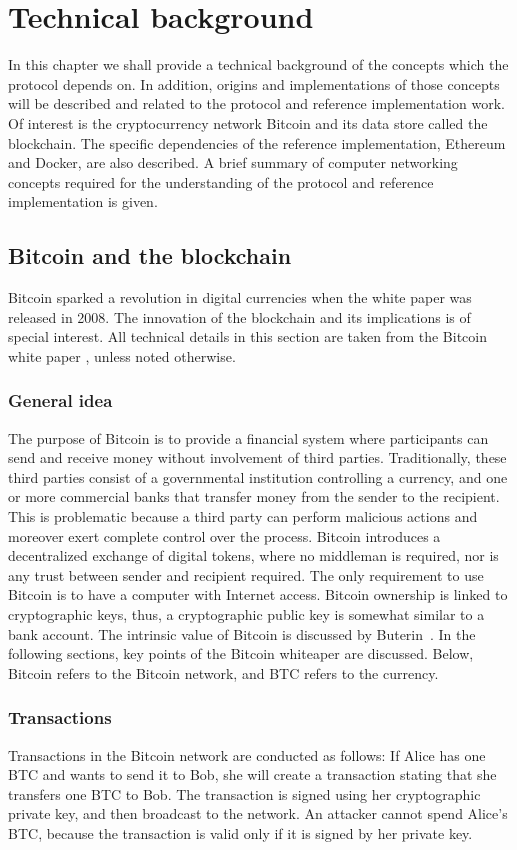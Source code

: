 \chapter{Technical background}
In this chapter we shall provide a technical background of the concepts which the protocol depends on. In addition, origins and implementations of those concepts will be described and related to the protocol and reference implementation work. Of interest is the cryptocurrency network Bitcoin and its data store called the blockchain. The specific dependencies of the reference implementation, Ethereum and Docker, are also described. A brief summary of computer networking concepts required for the understanding of the protocol and reference implementation is given.

\section{Bitcoin and the blockchain}
Bitcoin sparked a revolution in digital currencies when the white paper was released in 2008. The innovation of the blockchain and its implications is of special interest. All technical details in this section are taken from the Bitcoin white paper \cite{btc}, unless noted otherwise.

\subsection{General idea}
The purpose of Bitcoin is to provide a financial system where participants can send and receive money without involvement of third parties. Traditionally, these third parties consist of a governmental institution controlling a currency, and one or more commercial banks that transfer money from the sender to the recipient. This is problematic because a third party can perform malicious actions and moreover exert complete control over the process. Bitcoin introduces a decentralized exchange of digital tokens, where no middleman is required, nor is any trust between sender and recipient required. The only requirement to use Bitcoin is to have a computer with Internet access. Bitcoin ownership is linked to cryptographic keys, thus, a cryptographic public key is somewhat similar to a bank account. The intrinsic value of Bitcoin is discussed by Buterin~\cite{buterin:2011}. In the following sections, key points of the Bitcoin whiteaper are discussed. Below, Bitcoin refers to the Bitcoin network, and BTC refers to the currency.

\subsection{Transactions}
Transactions in the Bitcoin network are conducted as follows: If Alice has one BTC and wants to send it to Bob, she will create a transaction stating that she transfers one BTC to Bob. The transaction is signed using her cryptographic private key, and then broadcast to the network. An attacker cannot spend Alice's BTC, because the transaction is valid only if it is signed by her private key.

